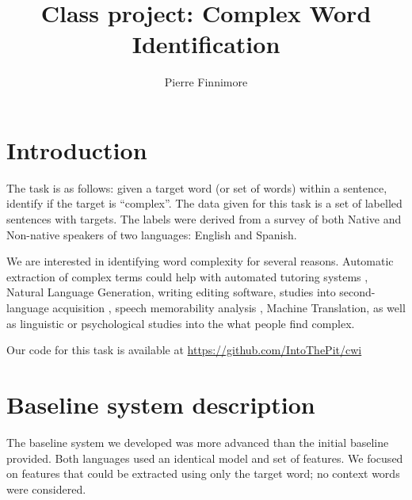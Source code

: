 \documentclass[11pt,a4paper]{article}
\title{Class project: Complex Word Identification}
\author{Pierre Finnimore}
\begin{document}
\maketitle
%

\section{Introduction}

The task is as follows: given a target word (or set of words) within a sentence, identify if the target is \enquote{complex}. The data given for this task is a set of labelled sentences with targets. The labels were derived from a survey of both Native and Non-native speakers of two languages: English and Spanish.

We are interested in identifying word complexity for several reasons. Automatic extraction of complex terms could help with automated tutoring systems \cite{valenti2003overview}, Natural Language Generation, writing editing software, studies into second-language acquisition \cite{ramirez2010morphological}, speech memorability analysis \cite{danescu2012you}, Machine Translation, as well as linguistic or psychological studies into the what people find complex. 

Our code for this task is available at \url{https://github.com/IntoThePit/cwi}

\section{Baseline system description}

The baseline system we developed was more advanced than the initial baseline provided. Both languages used an identical model and set of features. We focused on features that could be extracted using only the target word; no context words were considered.
\end{document}
